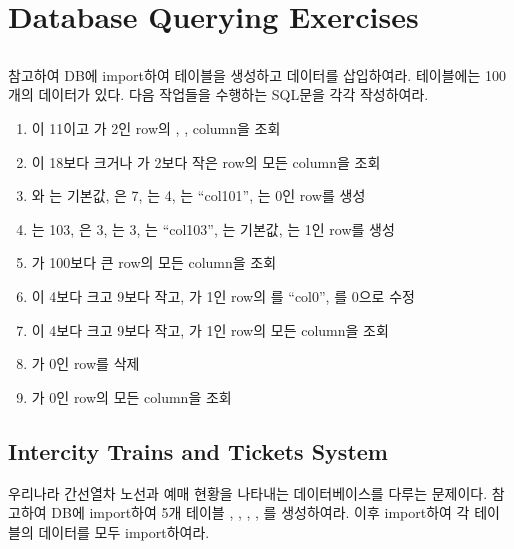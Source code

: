 \section{Database Querying Exercises}\label{sect:database-querying-exercises}

\subsection*{}

\을 참고하여 DB에 \을 import하여 테이블을 생성하고 데이터를 삽입하여라.  테이블에는 100개의 데이터가 있다. 다음 작업들을 수행하는 SQL문을 각각 작성하여라.

\begin{enumerate}
    \item {}이 11이고 가 2인 row의 , ,  column을 조회
    \item {}이 18보다 크거나 가 2보다 작은 row의 모든 column을 조회
    \item {}와 는 기본값, 은 7, 는 4, 는 ``col101'', 는 0인 row를 생성
    \item {}는 103, 은 3, 는 3, 는 ``col103'', 는 기본값, 는 1인 row를 생성
    \item {}가 100보다 큰 row의 모든 column을 조회
    \item {}이 4보다 크고 9보다 작고, 가 1인 row의 를 ``col0'', 를 0으로 수정
    \item {}이 4보다 크고 9보다 작고, 가 1인 row의 모든 column을 조회
    \item {}가 0인 row를 삭제
    \item {}가 0인 row의 모든 column을 조회
\end{enumerate}

\subsection*{Intercity Trains and Tickets System}

\과 \는 우리나라 간선열차 노선과 예매 현황을 나타내는 데이터베이스를 다루는 문제이다. \을 참고하여 DB에 \를 import하여 5개 테이블 , , , , 를 생성하여라. 이후 \를 import하여 각 테이블의 데이터를 모두 import하여라.

